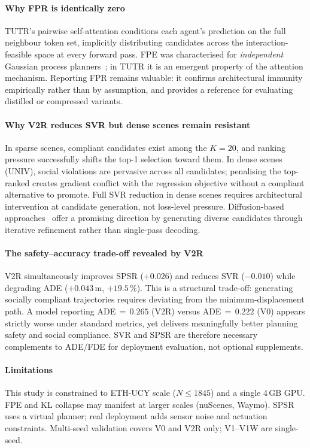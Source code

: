 \documentclass[journal]{IEEEtran}
\begin{document}
\paragraph{Why FPR is identically zero}
TUTR's pairwise self-attention conditions each agent's prediction on
the full neighbour token set, implicitly distributing candidates
across the interaction-feasible space at every forward pass.
FPE was characterised for \emph{independent} Gaussian process
planners~\cite{trautman2010unfreezing}; in TUTR it is an emergent
property of the attention mechanism.
Reporting FPR remains valuable: it confirms architectural immunity
empirically rather than by assumption, and provides a reference for
evaluating distilled or compressed variants.

\paragraph{Why V2R reduces SVR but dense scenes remain resistant}
In sparse scenes, compliant candidates exist among the $K{=}20$,
and ranking pressure successfully shifts the top-1 selection toward
them.
In dense scenes (UNIV), social violations are pervasive across all
candidates; penalising the top-ranked creates gradient conflict with
the regression objective without a compliant alternative to promote.
Full SVR reduction in dense scenes requires architectural intervention at candidate generation, not loss-level pressure. Diffusion-based approaches~\cite{gu2023motiondiffuser} offer a promising direction by generating diverse candidates through iterative refinement rather than single-pass decoding.

\paragraph{The safety--accuracy trade-off revealed by V2R}
V2R simultaneously improves SPSR ($+0.026$) and reduces SVR ($-0.010$)
while degrading ADE ($+0.043$\,m, $+19.5\,\%$).
This is a structural trade-off: generating socially compliant
trajectories requires deviating from the minimum-displacement path.
A model reporting ADE\,\(=\,0.265\) (V2R) versus ADE\,\(=\,0.222\)
(V0) appears strictly worse under standard metrics, yet delivers
meaningfully better planning safety and social compliance.
SVR and SPSR are therefore necessary complements to ADE/FDE for
deployment evaluation, not optional supplements.

\paragraph{Limitations}
This study is constrained to ETH-UCY scale ($N\leq1845$) and a
single 4\,GB GPU.
FPE and KL collapse may manifest at larger scales (nuScenes, Waymo).
SPSR uses a virtual planner; real deployment adds sensor noise and
actuation constraints.
Multi-seed validation covers V0 and V2R only; V1--V1W are single-seed.
\end{document}
